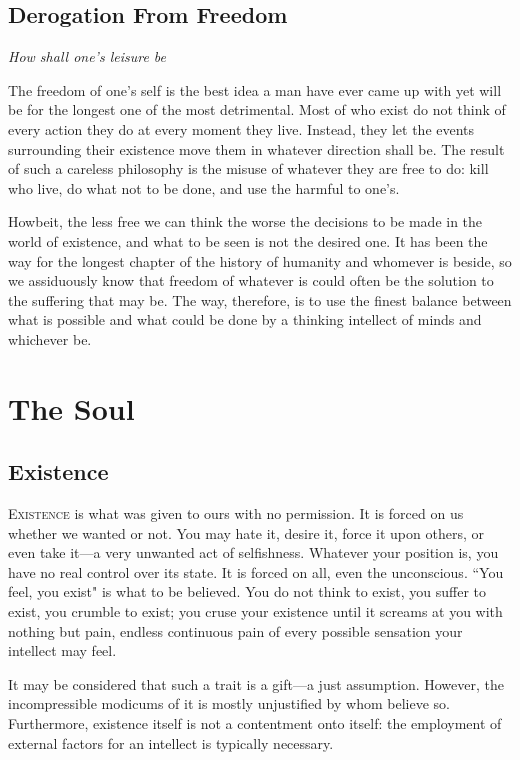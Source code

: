 \documentclass[twoside]{book}
\begin{document}
\section{Derogation From Freedom}
\textit{How shall one's leisure be}

The freedom of one's self is the best idea a man have ever came up with yet will
be for the longest one of the most detrimental. Most of who exist do not think
of every action they do at every moment they live. Instead, they let the events
surrounding their existence move them in whatever direction shall be. The result
of such a careless philosophy is the misuse of whatever they are free to do:
kill who live, do what not to be done, and use the harmful to one's.

Howbeit, the less free we can think the worse the decisions to be made in the
world of existence, and what to be seen is not the desired one. It has been the
way for the longest chapter of the history of humanity and whomever is beside,
so we assiduously know that freedom of whatever is could often be the solution
to the suffering that may be. The way, therefore, is to use the finest balance
between what is possible and what could be done by a thinking intellect of minds
and whichever be.

\chapter{The Soul}
\section{Existence}

\lettrine{E}{xistence} is what was given to ours with no permission. It is forced
on us whether we wanted or not. You may hate it, desire it, force it upon
others, or even take it—a very unwanted act of selfishness. Whatever your
position is, you have no real control over its state. It is forced on all, even
the unconscious. ``You feel, you exist" is what to be believed. You do not think
to exist, you suffer to exist, you crumble to exist; you cruse your existence
until it screams at you with nothing but pain, endless continuous pain of every
possible sensation your intellect may feel.

It may be considered that such a trait is a gift—a just assumption. However,
the incompressible modicums of it is mostly unjustified by whom believe so.
Furthermore, existence itself is not a contentment onto itself: the employment
of external factors for an intellect is typically necessary.
\end{document}
